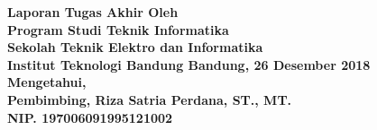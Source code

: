 \clearpage
\pagestyle{empty}

\begin{center}
\smallskip
    \Large \bfseries \MakeUppercase{\thetitle}
    \vfill
    \Large Laporan Tugas Akhir
    \vfill
    \large Oleh
    \Large \theauthor \\
    \large Program Studi Teknik Informatika \\ Sekolah Teknik Elektro dan Informatika \\ Institut Teknologi Bandung
    \vfill
    \normalsize \normalfont
    \vfill
    Bandung, 26 Desember 2018 \\
    Mengetahui, \\
    Pembimbing,
    \vfill
    \vfill
    \vfill
    Riza Satria Perdana, ST., MT. \\
    NIP. 197006091995121002
\end{center}
\clearpage
